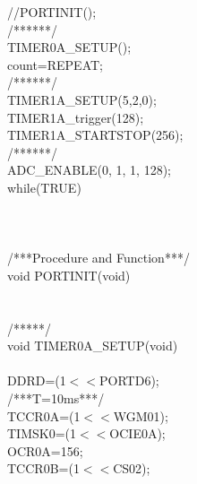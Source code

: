 \documentclass[titlepage, a4paper, 10pt, reqno, openany]{report}
\begin{document}
\begin{minipage}[t]{.35\linewidth}
	\hspace*{.5cm}	//PORTINIT(); \\
	\hspace*{.5cm}	/******/ \\
	\hspace*{.5cm}	TIMER0A\_SETUP(); \\
	\hspace*{.5cm}	count=REPEAT; \\
	\hspace*{.5cm}	/******/ \\
	\hspace*{.5cm}	TIMER1A\_SETUP(5,2,0); \\
	\hspace*{.5cm}	TIMER1A\_trigger(128); \\
	\hspace*{.5cm}	TIMER1A\_STARTSTOP(256); \\
	\hspace*{.5cm}	/******/ \\
	\hspace*{.5cm}	ADC\_ENABLE(0, 1, 1, 128); \\
	\hspace*{.5cm}    while(TRUE) \\
	\hspace*{.5cm}    \textbraceleft \\
	\hspace*{.5cm}    \textbraceright \\
	\textbraceright \\
	/***Procedure and Function***/ \\
	void PORTINIT(void) \\
	\textbraceleft \\
	\textbraceright \\
	/*****/ \\
	void TIMER0A\_SETUP(void) \\
	\textbraceleft \\
	\hspace*{.5cm}	DDRD=(1$<<$PORTD6); \\
	\hspace*{.5cm}	/***T=10ms***/ \\
	\hspace*{.5cm}	TCCR0A=(1$<<$WGM01); \\
	\hspace*{.5cm}	TIMSK0=(1$<<$OCIE0A); \\
	\hspace*{.5cm}	OCR0A=156; \\
	\hspace*{.5cm}	TCCR0B\textbar =(1$<<$CS02); \\

\end{minipage}
\end{document}
